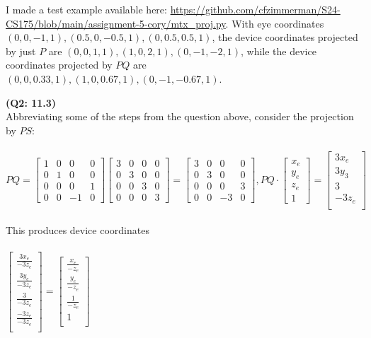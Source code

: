 \documentclass[letterpaper, 11pt]{article}
\begin{document}
\medskip
I made a test example available here: \url{https://github.com/cfzimmerman/S24-CS175/blob/main/assignment-5-cory/mtx_proj.py}. With eye coordinates $(0, 0,-1, 1), (0.5, 0, -0.5, 1), (0, 0.5, 0.5, 1)$, the device coordinates projected by just $P$ are $(0, 0, 1, 1), (1, 0, 2, 1), (0, -1, -2, 1)$, while the device coordinates projected by $PQ$ are $(0, 0, 0.33, 1), (1, 0, 0.67, 1), (0, -1, -0.67, 1)$. 

\medskip
\textbf{(Q2: 11.3)} \\ 
Abbreviating some of the steps from the question above, consider the projection by $PS$: \\ \\
$PQ = \begin{bmatrix}
1 & 0 & 0 & 0 \\
0 & 1 & 0 & 0 \\
0 & 0 & 0 & 1 \\
0 & 0 & -1 & 0
\end{bmatrix} 
\begin{bmatrix}
3 & 0 & 0 & 0 \\
0 & 3 & 0 & 0 \\
0 & 0 & 3 & 0 \\
0 & 0 & 0 & 3
\end{bmatrix}
=
\begin{bmatrix}
3 & 0 & 0 & 0 \\
0 & 3 & 0 & 0 \\
0 & 0 & 0 & 3 \\
0 & 0 & -3 & 0
\end{bmatrix},
PQ \cdot 
\begin{bmatrix}
x_e  \\
y_e  \\
z_e  \\
1 
\end{bmatrix}
=
\begin{bmatrix}
3x_e  \\
3y_3 \\
3 \\
-3z_e \\ 
\end{bmatrix}$ \\ \\ 

This produces device coordinates \\ \\ 
$\begin{bmatrix}
  \frac{3x_e}{-3z_e}  \\
  \frac{3y_e}{-3z_e} \\
  \frac{3}{-3z_e} \\
  \frac{-3z_e}{-3z_e} \\ 
\end{bmatrix}
=
\begin{bmatrix}
  \frac{x_e}{-z_e}  \\
  \frac{y_e}{-z_e} \\
  \frac{1}{-z_e} \\
  1 \\ 
\end{bmatrix}$ \\ \\ 
\end{document}
